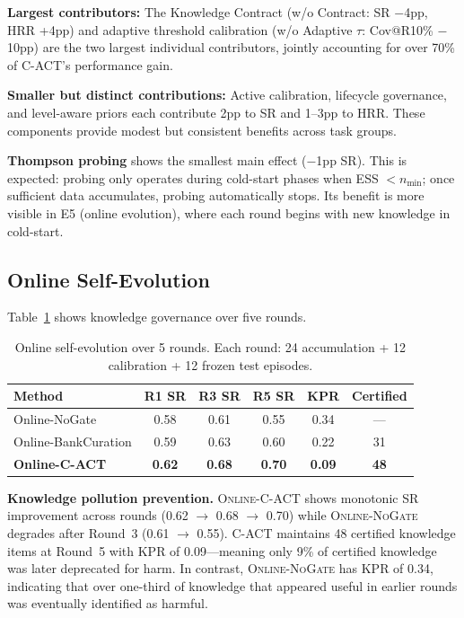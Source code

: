 \documentclass[letterpaper]{article}
\begin{document}
\textbf{Largest contributors:} The Knowledge Contract (w/o Contract: SR $-$4pp, HRR +4pp) and adaptive threshold calibration (w/o Adaptive $\tau$: Cov@R10\% $-$10pp) are the two largest individual contributors, jointly accounting for over 70\% of \textsc{C-ACT}'s performance gain.

\textbf{Smaller but distinct contributions:} Active calibration, lifecycle governance, and level-aware priors each contribute 2pp to SR and 1--3pp to HRR. These components provide modest but consistent benefits across task groups.

\textbf{Thompson probing} shows the smallest main effect ($-$1pp SR). This is expected: probing only operates during cold-start phases when ESS $< n_{\min}$; once sufficient data accumulates, probing automatically stops. Its benefit is more visible in E5 (online evolution), where each round begins with new knowledge in cold-start.

\subsection{Online Self-Evolution}

Table~\ref{tab:online} shows knowledge governance over five rounds.

\begin{table}[t]
\centering
\caption{Online self-evolution over 5 rounds. Each round: 24 accumulation + 12 calibration + 12 frozen test episodes.}
\label{tab:online}
\begin{tabular}{lccccc}
\toprule
\textbf{Method} & \textbf{R1 SR} & \textbf{R3 SR} & \textbf{R5 SR} & \textbf{KPR} & \textbf{Certified} \\
\midrule
Online-NoGate       & 0.58 & 0.61 & 0.55 & 0.34 & --- \\
Online-BankCuration & 0.59 & 0.63 & 0.60 & 0.22 & 31 \\
\textbf{Online-C-ACT} & \textbf{0.62} & \textbf{0.68} & \textbf{0.70} & \textbf{0.09} & \textbf{48} \\
\bottomrule
\end{tabular}
\end{table}

\textbf{Knowledge pollution prevention.} \textsc{Online-C-ACT} shows monotonic SR improvement across rounds (0.62 $\rightarrow$ 0.68 $\rightarrow$ 0.70) while \textsc{Online-NoGate} degrades after Round~3 (0.61 $\rightarrow$ 0.55). \textsc{C-ACT} maintains 48 certified knowledge items at Round~5 with KPR of 0.09---meaning only 9\% of certified knowledge was later deprecated for harm. In contrast, \textsc{Online-NoGate} has KPR of 0.34, indicating that over one-third of knowledge that appeared useful in earlier rounds was eventually identified as harmful.
\end{document}
